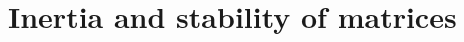 \section{Inertia and stability of matrices}
\nosolution

\nosolution

\nosolution

\nosolution

\nosolution
